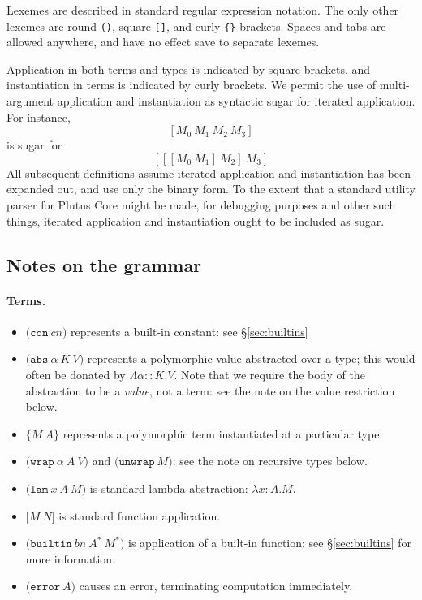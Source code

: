 \documentclass[a4paper]{article}
\newcommand{\keyword}[1]{\texttt{#1}}
\newcommand{\construct}[1]{\texttt{(} #1 \texttt{)}}
\newcommand{\con}[1]{\construct{\keyword{con} ~ #1}}
\newcommand{\abs}[3]{\construct{\keyword{abs} ~ #1 ~ #2 ~ #3}}
\newcommand{\inst}[2]{\texttt{\{}#1 ~ #2\texttt{\}}}
\newcommand{\lam}[3]{\construct{\keyword{lam} ~ #1 ~ #2 ~ #3}}
\newcommand{\app}[2]{\texttt{[} #1 ~ #2 \texttt{]}}
\newcommand{\wrap}[3]{\construct{\keyword{wrap} ~ #1 ~ #2 ~ #3}}
\newcommand{\unwrap}[1]{\construct{\keyword{unwrap} ~ #1}}
\newcommand{\builtin}[3]{\construct{\keyword{builtin} ~ #1 ~ #2 ~ #3}}
\newcommand{\error}[1]{\construct{\keyword{error} ~ #1}}
\newcommand{\appT}[2]{\texttt{[} #1 ~ #2 \texttt{]}}
\begin{document}
Lexemes are described in standard regular expression notation.  The only other
lexemes are round \texttt{()}, square \texttt{[]}, and curly \texttt{\{\}}
brackets.  Spaces and tabs are allowed anywhere, and have no effect
save to separate lexemes.

Application in both terms and types is indicated by square
brackets, and instantiation in terms is indicated by curly brackets. We
permit the use of multi-argument application and instantiation as
syntactic sugar for iterated application.
For instance,
\[
  [M_0 ~ M_1 ~ M_2 ~ M_3]
\]
is sugar for
\[
  [[[M_0 ~ M_1] ~ M_2] ~ M_3]
\]
All subsequent definitions assume iterated application and instantiation
has been expanded out, and use only the binary form. To the extent that
a standard utility parser for Plutus Core might be made, for debugging
purposes and other such things, iterated application and instantiation
ought to be included as sugar.






\newcommand\fixtype[1]{\mu\,\alpha.#1}  %

\subsection{Notes on the grammar}
\paragraph{Terms.}
\begin{itemize}
\item $\con{cn}$ represents a built-in constant: see \S\ref{sec:builtins}
\item $\abs{\alpha}{K}{V}$ represents a polymorphic value abstracted
  over a type; this would often be donated by $\Lambda\alpha{::}K.V$.
  Note that we require the body of the abstraction to be a
  \textit{value}, not a term: see the note on the value restriction below.
\item $\inst{M}{A}$ represents a polymorphic term instantiated at a particular type.
\item $\wrap{\alpha}{A}{V}$ and $\unwrap{M}$: see the note on recursive types below.
\item $\lam{x}{A}{M}$ is standard lambda-abstraction: $\lambda{}x{:}{A}.{M}$.
\item $\app{M}{N}$ is standard function application.
\item $\builtin{bn}{A^*}{M^*}$ is application of a built-in function: see \S\ref{sec:builtins} for more information.
\item $\error{A}$ causes an error, terminating computation immediately.
\end{itemize}
\end{document}
